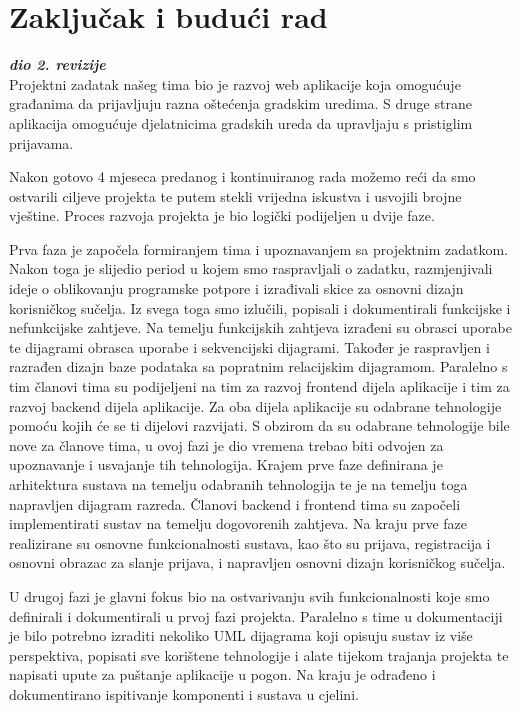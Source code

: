 \chapter{Zaključak i budući rad}
		
		\textbf{\textit{dio 2. revizije}}\\
		
		Projektni zadatak našeg tima bio je razvoj web aplikacije koja omogućuje građanima da prijavljuju razna oštećenja gradskim uredima. S druge strane aplikacija omogućuje djelatnicima gradskih ureda da upravljaju s pristiglim prijavama.
		
		Nakon gotovo 4 mjeseca predanog i kontinuiranog rada možemo reći da smo ostvarili ciljeve projekta te putem stekli vrijedna iskustva i usvojili brojne vještine. Proces razvoja projekta je bio logički podijeljen u dvije faze.
		
		Prva faza je započela formiranjem tima i upoznavanjem sa projektnim zadatkom. Nakon toga je slijedio period u kojem smo raspravljali o zadatku, razmjenjivali ideje o oblikovanju programske potpore i izrađivali skice za osnovni dizajn korisničkog sučelja. Iz svega toga smo izlučili, popisali i dokumentirali funkcijske i nefunkcijske zahtjeve. Na temelju funkcijskih zahtjeva izrađeni su obrasci uporabe te dijagrami obrasca uporabe i sekvencijski dijagrami. Također je raspravljen i razrađen dizajn baze podataka sa popratnim relacijskim dijagramom. Paralelno s tim članovi tima su podijeljeni na tim za razvoj frontend dijela aplikacije i tim za razvoj backend dijela aplikacije. Za oba dijela aplikacije su odabrane tehnologije pomoću kojih će se ti dijelovi razvijati. S obzirom da su odabrane tehnologije bile nove za članove tima, u ovoj fazi je dio vremena trebao biti odvojen za upoznavanje i usvajanje tih tehnologija. Krajem prve faze definirana je arhitektura sustava na temelju odabranih tehnologija te je na temelju toga napravljen dijagram razreda. Članovi backend i frontend tima su započeli implementirati sustav na temelju dogovorenih zahtjeva. Na kraju prve faze realizirane su osnovne funkcionalnosti sustava, kao što su prijava, registracija i osnovni obrazac za slanje prijava, i napravljen osnovni dizajn korisničkog sučelja.
		
		U drugoj fazi je glavni fokus bio na ostvarivanju svih funkcionalnosti koje smo definirali i dokumentirali u prvoj fazi projekta. Paralelno s time u dokumentaciji je bilo potrebno izraditi nekoliko UML dijagrama koji opisuju sustav iz više perspektiva, popisati sve korištene tehnologije i alate tijekom trajanja projekta te napisati upute za puštanje aplikacije u pogon. Na kraju je odrađeno i dokumentirano ispitivanje komponenti i sustava u cjelini.
		
